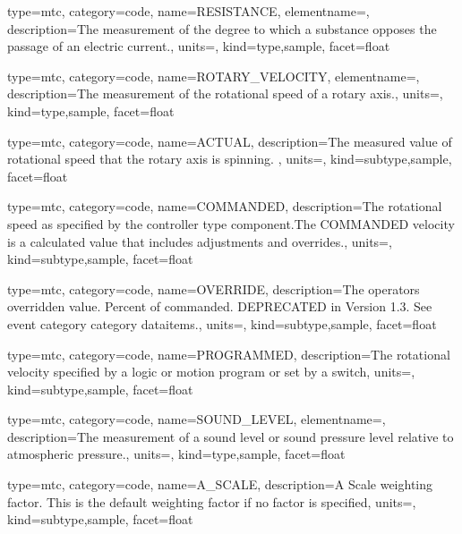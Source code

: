 {
  type=mtc,
  category=code,
  name={RESISTANCE},
  elementname=,
  description={The measurement of the degree to which a substance opposes the passage of an electric current.},
  units=,
  kind={type,sample},
  facet={\gls{float}}
}


{
  type=mtc,
  category=code,
  name={ROTARY\_VELOCITY},
  elementname=,
  description={The measurement of the rotational speed of a rotary axis.},
  units=,
  kind={type,sample},
  facet={\gls{float}}
}


{
  type=mtc,
  category=code,
  name={ACTUAL},
  description={The measured value of rotational speed that the rotary axis is spinning. },
  units=,
  kind={subtype,sample},
  facet={\gls{float}}
}


{
  type=mtc,
  category=code,
  name={COMMANDED},
  description={The rotational speed as specified by the \gls{controller} type component.The COMMANDED velocity is a calculated value that includes adjustments and overrides.},
  units=,
  kind={subtype,sample},
  facet={\gls{float}}
}


{
  type=mtc,
  category=code,
  name={OVERRIDE},
  description={The operators overridden value.  Percent of commanded. DEPRECATED in Version 1.3.   See \gls{event category} category \glspl{dataitem}.},
  units=,
  kind={subtype,sample},
  facet={\gls{float}}
}


{
  type=mtc,
  category=code,
  name={PROGRAMMED},
  description={The rotational velocity specified by a logic or motion program or set by a switch},
  units=,
  kind={subtype,sample},
  facet={\gls{float}}
}


{
  type=mtc,
  category=code,
  name={SOUND\_LEVEL},
  elementname=,
  description={The measurement of a sound level or sound pressure level relative to atmospheric pressure.},
  units=,
  kind={type,sample},
  facet={\gls{float}}
}


{
  type=mtc,
  category=code,
  name={A\_SCALE},
  description={A Scale weighting factor.   This is the default weighting factor if no factor is specified},
  units=,
  kind={subtype,sample},
  facet={\gls{float}}
}



